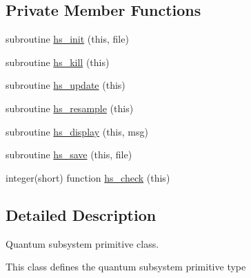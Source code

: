 \subsection*{Private Member Functions}
\begin{DoxyCompactItemize}
\item 
subroutine \hyperlink{classhs__class_a7857d1f3d6a49cfbc7d397a084a9013f}{hs\+\_\+init} (this, file)
\item 
subroutine \hyperlink{classhs__class_a1d1b34bdecfb1004bd277bf53dbd3e92}{hs\+\_\+kill} (this)
\item 
subroutine \hyperlink{classhs__class_a8a479624da65dc4f4a5cae9826487bec}{hs\+\_\+update} (this)
\item 
subroutine \hyperlink{classhs__class_abf39e51fc1d47061279287a7e328d9d4}{hs\+\_\+resample} (this)
\item 
subroutine \hyperlink{classhs__class_af457ecc48ec3ffc1c107162e546155ce}{hs\+\_\+display} (this, msg)
\item 
subroutine \hyperlink{classhs__class_a3b78604825b27d4d06a70aac14b8c538}{hs\+\_\+save} (this, file)
\item 
integer(short) function \hyperlink{classhs__class_add814b6ed9b2a64f43ea34b91ce20894}{hs\+\_\+check} (this)
\end{DoxyCompactItemize}


\subsection{Detailed Description}
Quantum subsystem primitive class. 

This class defines the quantum subsystem primitive type 

